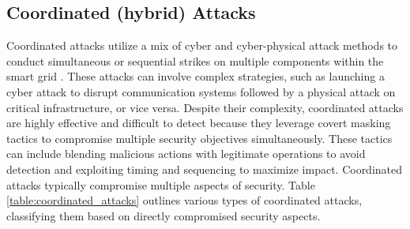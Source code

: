 \documentclass[10pt, journal]{IEEEtran}
\begin{document}
\subsection{Coordinated (hybrid) Attacks}

Coordinated attacks utilize a mix of cyber and cyber-physical attack methods to conduct simultaneous or sequential strikes on multiple components within the smart grid \cite{tian2020coordinated}. These attacks can involve complex strategies, such as launching a cyber attack to disrupt communication systems followed by a physical attack on critical infrastructure, or vice versa. Despite their complexity, coordinated attacks are highly effective and difficult to detect because they leverage covert masking tactics to compromise multiple security objectives simultaneously. These tactics can include blending malicious actions with legitimate operations to avoid detection and exploiting timing and sequencing to maximize impact. Coordinated attacks typically compromise multiple aspects of security. Table \ref{table:coordinated_attacks} outlines various types of coordinated attacks, classifying them based on directly compromised security aspects.

\end{document}
